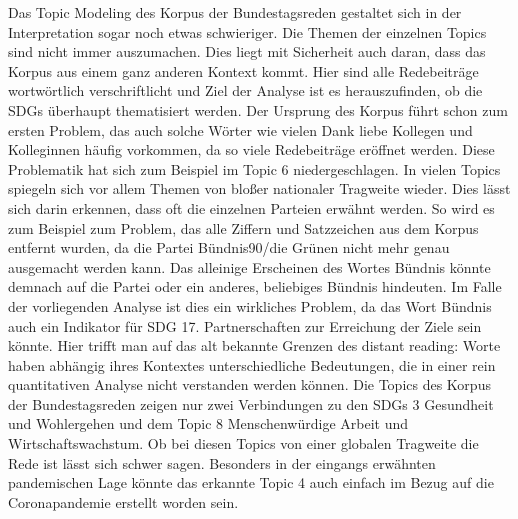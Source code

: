 \documentclass[letterpaper]{article}
\begin{document}
Das Topic Modeling des Korpus der Bundestagsreden gestaltet sich in der Interpretation sogar noch etwas schwieriger. Die Themen der einzelnen Topics sind nicht immer auszumachen. Dies liegt mit Sicherheit auch daran, dass das Korpus aus einem ganz anderen Kontext kommt. Hier sind alle Redebeiträge wortwörtlich verschriftlicht und Ziel der Analyse ist es herauszufinden, ob die SDGs überhaupt thematisiert werden. Der Ursprung des Korpus führt schon zum ersten Problem, das auch solche Wörter wie \glqq vielen \grqq{} \glqq Dank \grqq{} \glqq liebe\grqq{} \glqq Kollegen\grqq{} und \glqq Kolleginnen \grqq{} häufig vorkommen, da so viele Redebeiträge eröffnet werden. Diese Problematik hat sich zum Beispiel im Topic 6 niedergeschlagen. In vielen Topics spiegeln sich vor allem Themen von bloßer nationaler Tragweite wieder. Dies lässt sich darin erkennen, dass oft die einzelnen Parteien erwähnt werden. So wird es zum Beispiel zum Problem, das alle Ziffern und Satzzeichen aus dem Korpus entfernt wurden, da die Partei \glqq Bündnis90/die Grünen\grqq{} nicht mehr genau ausgemacht werden kann. Das alleinige Erscheinen des Wortes \glqq Bündnis\grqq{} könnte demnach auf die Partei oder ein anderes, beliebiges Bündnis hindeuten. Im Falle der vorliegenden Analyse ist dies ein wirkliches Problem, da das Wort \glqq Bündnis\grqq{} auch ein Indikator für SDG 17. \glqq Partnerschaften zur Erreichung der Ziele\grqq{} sein könnte. Hier trifft man auf das alt bekannte Grenzen des distant reading: Worte haben abhängig ihres Kontextes unterschiedliche Bedeutungen, die in einer rein quantitativen Analyse nicht verstanden werden können\cite{Raman}. Die Topics des Korpus der Bundestagsreden zeigen nur zwei Verbindungen zu den SDGs 3 \glqq Gesundheit und Wohlergehen\grqq{} und dem Topic 8 \glqq Menschenwürdige Arbeit und Wirtschaftswachstum\grqq{}. Ob bei diesen Topics von einer globalen Tragweite die Rede ist lässt sich schwer sagen. Besonders in der eingangs erwähnten pandemischen Lage könnte das erkannte Topic 4 auch einfach im Bezug auf die Coronapandemie erstellt worden sein. \\

\clearpage
\end{document}
